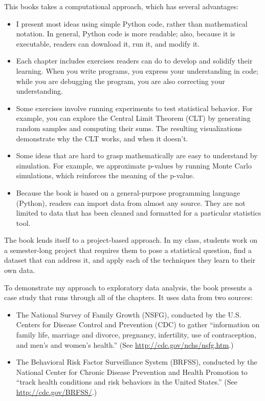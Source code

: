 \documentclass[12pt]{book}
\begin{document}
This books takes a computational approach, which has several
advantages:

\begin{itemize}

\item I present most ideas using simple Python code, rather than
  mathematical notation.  In general, Python code is more readable;
  also, because it is executable, readers can download it, run it,
  and modify it.

\item Each chapter includes exercises readers can do to develop
  and solidify their learning.  When you write programs, you
  express your understanding in code; while you are debugging the
  program, you are also correcting your understanding.

\item Some exercises involve running experiments to test statistical
  behavior.  For example, you can explore the Central Limit Theorem
  (CLT) by generating random samples and computing their sums.  The
  resulting visualizations demonstrate why the CLT works, and when
  it doesn't.

\item Some ideas that are hard to grasp mathematically are easy to
  understand by simulation.  For example, we approximate p-values by
  running Monte Carlo simulations, which reinforces the meaning of the
  p-value.

\item Because the book is based on a general-purpose programming language
  (Python), readers can import data from almost any
  source.  They are not limited to data that has been cleaned and
  formatted for a particular statistics tool.

\end{itemize}

The book lends itself to a project-based approach.  In my class,
students work on a semester-long project that requires them to pose a
statistical question, find a dataset that can address it, and apply
each of the techniques they learn to their own data.

To demonstrate my approach to exploratory data analysis, the book
presents a case study that runs through all of the chapters.  It uses
data from two sources:

\begin{itemize}

\item The National Survey of Family Growth (NSFG), conducted by the
  U.S. Centers for Disease Control and Prevention (CDC) to gather
  ``information on family life, marriage and divorce, pregnancy,
  infertility, use of contraception, and men's and women's health.''
  (See \url{http://cdc.gov/nchs/nsfg.htm}.)

\item The Behavioral Risk Factor Surveillance System (BRFSS),
  conducted by the National Center for Chronic Disease Prevention and
  Health Promotion to ``track health conditions and risk behaviors in
  the United States.''  (See \url{http://cdc.gov/BRFSS/}.)

\end{itemize}
\end{document}
